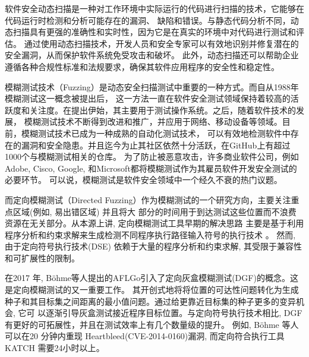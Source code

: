 \documentclass[bachelor]{njupthesis}
\begin{document}
软件安全动态扫描是一种对工作环境中实际运行的代码进行扫描的技术，它能够在代码运行时检测和分析可能存在的漏洞、
缺陷和错误。与静态代码分析不同，动态扫描具有更强的准确性和实时性，因为它是在真实的环境中对代码进行测试和评估。
通过使用动态扫描技术，开发人员和安全专家可以有效地识别并修复潜在的安全漏洞，从而保护软件系统免受攻击和破坏。
此外，动态扫描还可以帮助企业遵循各种合规性标准和法规要求，确保其软件应用程序的安全性和稳定性。

模糊测试技术（Fuzzing）是动态安全扫描测试中重要的一种方式。而自从1988年模糊测试这一概念被提出后，
这一方法一直在软件安全测试领域保持着较高的活跃度和关注度。在提出伊始，其主要用于测试操作系统。之后，随着软件技术的发展，
模糊测试技术不断得到改进和推广，并应用于网络、移动设备等领域。目前，模糊测试技术已成为一种成熟的自动化测试技术，
可以有效地检测软件中存在的漏洞和安全隐患。并且迄今为止其社区依然十分活跃，在GitHub上有超过1000个与模糊测试相关的仓库\cite{manes2019art}。
为了防止被恶意攻击，许多商业软件公司，例如Adobe, Cisco, Google, 和Microsoft都将模糊测试作为其雇员软件开发安全测试的必要环节。
可以说，模糊测试是软件安全领域中一个经久不衰的热门议题。

而定向模糊测试（Directed Fuzzing）作为模糊测试的一个研究方向，主要关注重点区域(例如, 易出错区域) 并且将大
部分的时间用于到达测试这些位置而不浪费资源在无关部分\cite{wang2022}。从本源上讲, 定向模糊测试工具早期的解决思路
主要是基于利用程序分析和约束求解来生成检测不同程序执行路径输入符号的执行技术
\cite{ganesh2009taint,ma2011directed,person2011directed,do2013dynamic,ge2011dyta,li2013software}。
然而, 由于定向符号执行技术(DSE) 依赖于大量的程序分析和约束求解, 其受限于兼容性和可扩展性的限制。

在2017 年, Böhme等人提出的AFLGo\cite{bohmeDGF2017}引入了定向灰盒模糊测试(DGF)的概念。这是定向模糊测试的又一重要工作。
其开创式地将将位置的可达性问题转化为生成种子和其目标集之间距离的最小值问题。通过给更靠近目标集的种子更多的变异机会, 它可
以逐渐引导灰盒测试接近程序目标位置。与定向符号执行技术相比, DGF有更好的可拓展性，并且在测试效率上有几个数量级的提升。
例如, Böhme 等人可以在20 分钟内重现 Heartbleed\cite{Heartbleed}(CVE-2014-0160)漏洞, 而定向符合执行工具
KATCH\cite{marinescu2013katch} 需要24小时以上\cite{bohmeDGF2017}。
\end{document}
